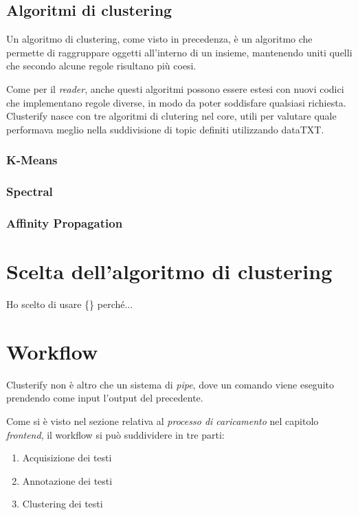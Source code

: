 	\subsection{Algoritmi di clustering}
		Un algoritmo di clustering, come visto in precedenza, è un algoritmo che permette di raggruppare oggetti all'interno di un insieme, mantenendo uniti quelli che secondo alcune regole risultano più coesi.

		Come per il \emph{reader}, anche questi algoritmi possono essere estesi con nuovi codici che implementano regole diverse, in modo da poter soddisfare qualsiasi richiesta. Clusterify nasce con tre algoritmi di clutering nel core, utili per valutare quale performava meglio nella suddivisione di topic definiti utilizzando dataTXT.

		\subsubsection{K-Means}
			

		\subsubsection{Spectral}
			

		\subsubsection{Affinity Propagation}
			
		
\section{Scelta dell'algoritmo di clustering}
		Ho scelto di usare \{\} perché...

\section{Workflow}
	Clusterify non è altro che un sistema di \emph{pipe}, dove un comando viene eseguito prendendo come input l'output del precedente.

	Come si è visto nel sezione relativa al \emph{processo di caricamento} nel capitolo \emph{frontend}, il workflow si può suddividere in tre parti:

	\begin{enumerate}
  		\item Acquisizione dei testi
  		\item Annotazione dei testi
 		\item Clustering dei testi
	\end{enumerate} 
	
